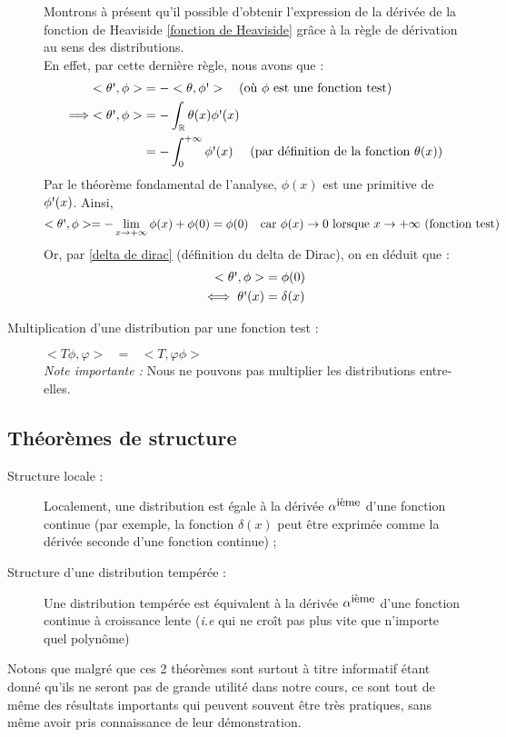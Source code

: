 \documentclass[../notesdecours.tex]{subfiles}
\begin{document}
\begin{description}
    Montrons à présent qu'il possible d'obtenir l'expression de la dérivée de la fonction de Heaviside \ref{fonction de Heaviside} grâce à la règle de dérivation au sens des distributions.  \\
    En effet, par cette dernière règle, nous avons que : 
    \begin{align}
        <\theta \mbox{\textquotesingle}, \phi> &= -<\theta, \phi \mbox{\textquotesingle}> \quad \mbox{(où $\phi$ est une fonction test)} \notag \\
        \implies <\theta \mbox{\textquotesingle}, \phi> &= - \int_{\mathbb{R}} \theta(x) \phi \mbox{\textquotesingle}(x) \notag \\
        &= - \int_0^{+ \infty} \phi \mbox{\textquotesingle}(x) \quad \mbox{ (par définition de la fonction $\theta(x)$)} \notag 
    \end{align}
    Par le théorème fondamental de l'analyse, $\phi(x)$ est une primitive de $\phi \mbox{\textquotesingle} (x)$. Ainsi, 
    \begin{equation} 
        <\theta \mbox{\textquotesingle}, \phi> = - \lim_{x \to +\infty} \phi(x) + \phi(0) = \phi(0) \quad \mbox{car $\phi(x) \to 0$ lorsque $x \to +\infty$ (fonction test)}
    \end{equation} 
    Or, par \ref{delta de dirac} (définition du delta de Dirac), on en déduit que : 
    \begin{align}
        <\theta \mbox{\textquotesingle}, \phi> &= \phi(0) \notag \\ 
        \iff \theta \mbox{\textquotesingle} (x) &= \delta (x)
    \end{align}
    \item [Multiplication d'une distribution par une fonction test :] $< T\phi, \varphi > \mbox{ } = \mbox{ } <T, \varphi \phi>$ \\
    \textit{Note importante : }Nous ne pouvons pas multiplier les distributions entre-elles.
\end{description}

\subsection{Théorèmes de structure}

\begin{description}
    \item[Structure locale :] Localement, une distribution est égale à la dérivée $\alpha^{\mbox{\small{ième}}}$ d'une fonction continue (par exemple, la fonction $\delta(x)$ peut être exprimée comme la dérivée seconde d'une fonction continue) ;
    \item[Structure d'une distribution tempérée :]  Une distribution tempérée est équivalent à la dérivée $\alpha^{\mbox{\small{ième}}}$ d'une fonction continue à croissance lente (\textit{i.e} qui ne croît pas plus vite que n'importe quel polynôme)
\end{description}
Notons que malgré que ces 2 théorèmes sont surtout à titre informatif étant donné qu'ils ne seront pas de grande utilité dans notre cours, ce sont tout de même des résultats importants qui peuvent souvent être très pratiques, 
sans même avoir pris connaissance de leur démonstration.
\end{document}
